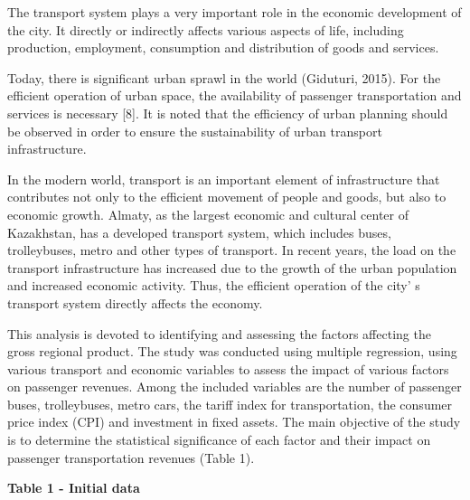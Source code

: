 The transport system plays a very important role in the economic
development of the city. It directly or indirectly affects various
aspects of life, including production, employment, consumption and
distribution of goods and services.

Today, there is significant urban sprawl in the world (Giduturi, 2015).
For the efficient operation of urban space, the availability of
passenger transportation and services is necessary {[}8{]}. It is noted
that the efficiency of urban planning should be observed in order to
ensure the sustainability of urban transport infrastructure.

In the modern world, transport is an important element of infrastructure
that contributes not only to the efficient movement of people and goods,
but also to economic growth. Almaty, as the largest economic and
cultural center of Kazakhstan, has a developed transport system, which
includes buses, trolleybuses, metro and other types of transport. In
recent years, the load on the transport infrastructure has increased due
to the growth of the urban population and increased economic activity.
Thus, the efficient operation of the city' s transport
system directly affects the economy.

This analysis is devoted to identifying and assessing the factors
affecting the gross regional product. The study was conducted using
multiple regression, using various transport and economic variables to
assess the impact of various factors on passenger revenues. Among the
included variables are the number of passenger buses, trolleybuses,
metro cars, the tariff index for transportation, the consumer price
index (CPI) and investment in fixed assets. The main objective of the
study is to determine the statistical significance of each factor and
their impact on passenger transportation revenues (Table 1).

{\bfseries Table 1 - Initial data}

